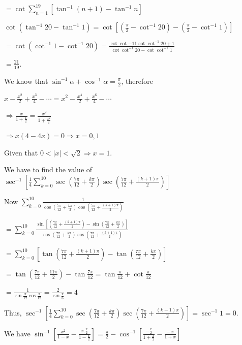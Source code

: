   $= \cot\displaystyle\sum_{n =1}^{19}\left[\tan^{-1}(n + 1) - \tan^{-1}n\right]$

  $\cot\left(\tan^{-1}20 - \tan^{-1}1\right) = \cot\left[\left(\frac{\pi}{2} - \cot^{-1}20\right)
  - \left(\frac{\pi}{2} - \cot^{-1}1\right)\right]$

  $= \cot\left(\cot^{-1}1 - \cot^{-1}20\right) = \frac{\cot\cot{-1}1\cot\cot^{-1}20 + 1}{\cot\cot^{-1}20
  - \cot\cot^{-1}1}$

  $= \frac{21}{19}$.
\item We know that $\sin^{-1}\alpha + \cos^{-1}\alpha = \frac{\pi}{2}$, therefore

  $x - \frac{x^2}{2} + \frac{x^3}{4}- \cdots = x^2 - \frac{x^4}{2} + \frac{x^6}{4} - \cdots$

  $\Rightarrow \frac{x}{1 + \frac{x}{2}} = \frac{x^2}{1 + \frac{x^2}{2}}$

  $\Rightarrow x(4 - 4x) = 0 \Rightarrow x = 0, 1$

  Given that $0 < |x| <\sqrt{2}\Rightarrow x = 1$.
\item We have to find the value of $\displaystyle\sec^{-1}\left[\frac{1}{4}\sum_{k =
    0}^{10}\sec\left(\frac{7\pi}{12} + \frac{k\pi}{2}\right)\sec\left(\frac{7\pi}{12} + \frac{(k +
    1)\pi}{2}\right)\right]$

  Now $\displaystyle\sum_{k = 0}^{10}\frac{1}{\cos\left(\frac{7\pi}{12}
    + \frac{k\pi}{2}\right)\cos\left(\frac{7\pi}{12} + \frac{(k + 1)\pi}{2}\right)}$

  $= \displaystyle\sum_{k = 0}^{10}\frac{\sin\left[\left(\frac{7\pi}{12} + \frac{(k + 1)\pi}{2}\right)
      - \sin\left(\frac{7\pi}{12} + \frac{k\pi}{2}\right)\right]}{\cos\left(\frac{7\pi}{12}
    + \frac{k\pi}{2}\right)\cos\left(\frac{7\pi}{12} + \frac{(k + 1)\pi}{2}\right)}$

  $= \displaystyle\sum_{k = 0}^{10}\left[\tan\left(\frac{7\pi}{12} + \frac{(k + 1)\pi}{2}\right)
    - \tan\left(\frac{7\pi}{12} + \frac{k\pi}{2}\right)\right]$

  $= \tan\left(\frac{7\pi}{12} + \frac{11\pi}{2}\right) - \tan\frac{7\pi}{12} = \tan\frac{\pi}{12}
  + \cot\frac{\pi}{12}$

  $= \frac{1}{\sin\frac{\pi}{12}\cos\frac{\pi}{12}} = \frac{2}{\sin\frac{\pi}{6}} = 4$

  Thus, $\displaystyle\sec^{-1}\left[\frac{1}{4}\sum_{k = 0}^{10}\sec\left(\frac{7\pi}{12}
    + \frac{k\pi}{2}\right)\sec\left(\frac{7\pi}{12} + \frac{(k + 1)\pi}{2}\right)\right] = \sec^{-1}1 = 0$.
\item We have $\sin^{-1}\left[\frac{x^2}{1 - x} - \frac{x.\frac{x}{2}}{1 - \frac{x}{2}}\right]
  = \frac{\pi}{2} - \cos^{-1}\left[\frac{-\frac{x}{2}}{1 + \frac{x}{2}} - \frac{-x}{1 + x}\right]$

